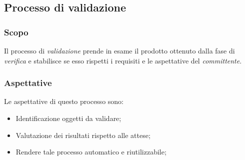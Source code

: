 		\subsection{Processo di validazione}
			\subsubsection{Scopo}
				Il processo di \emph{validazione} prende in esame il prodotto ottenuto dalla fase di \emph{verifica} e stabilisce se esso rispetti i requisiti e le aspettative del \emph{committente}.
			\subsubsection{Aspettative}
				Le aspettative di questo processo sono:
					\begin{itemize}
						\item Identificazione oggetti da validare;
						\item Valutazione dei risultati rispetto alle attese;
						\item Rendere tale processo automatico e riutilizzabile;
					\end{itemize}
